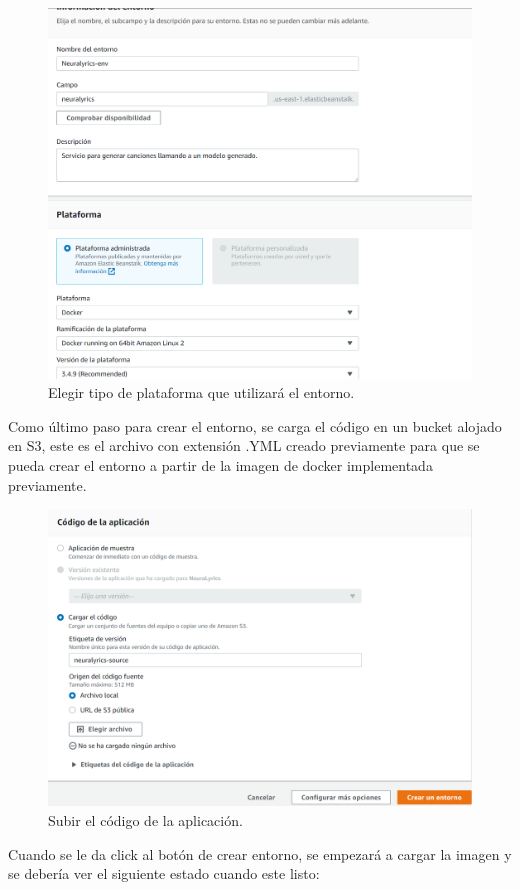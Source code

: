\documentclass[12pt, a4paper, titlepage]{article}
\begin{document}
		\begin{figure}[H]
			\includegraphics[width=12cm]{./Imagenes/BackEnd/paso_3.png}
			\centering 
			\caption{Elegir tipo de plataforma que utilizará el entorno.}
		\end{figure}
		Como último paso para crear el entorno, se carga el código en un bucket alojado en S3, este es el archivo con extensión .YML creado previamente para que se pueda crear el entorno a partir de la imagen de docker implementada previamente.
		\begin{figure}[H]
			\includegraphics[width=12cm]{./Imagenes/BackEnd/paso_4.png}
			\centering 
			\caption{Subir el código de la aplicación.}
		\end{figure}
		Cuando se le da click al botón de crear entorno, se empezará a cargar la imagen y se debería ver el siguiente estado cuando este listo:
\end{document}
